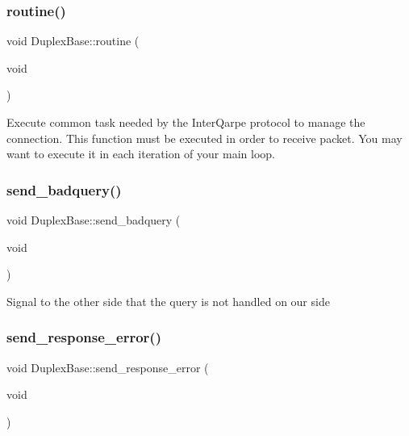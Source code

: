 \subsubsection{\texorpdfstring{routine()}{routine()}}
{\footnotesize\ttfamily void Duplex\+Base\+::routine (\begin{DoxyParamCaption}\item[{void}]{ }\end{DoxyParamCaption})}

Execute common task needed by the Inter\+Qarpe protocol to manage the connection. This function must be executed in order to receive packet. You may want to execute it in each iteration of your main loop. \mbox{\label{classInterQarpe_1_1DuplexBase_a730b5db8ac250221b881a99d7ae5b8a0}} 
\subsubsection{\texorpdfstring{send\+\_\+badquery()}{send\_badquery()}}
{\footnotesize\ttfamily void Duplex\+Base\+::send\+\_\+badquery (\begin{DoxyParamCaption}\item[{void}]{ }\end{DoxyParamCaption})\hspace{0.3cm}{\ttfamily [protected]}}

Signal to the other side that the query is not handled on our side \mbox{\label{classInterQarpe_1_1DuplexBase_a0dbd283fa8303c429eb1011fd01fcc16}} 
\subsubsection{\texorpdfstring{send\+\_\+response\+\_\+error()}{send\_response\_error()}\hspace{0.1cm}{\footnotesize\ttfamily [1/2]}}
{\footnotesize\ttfamily void Duplex\+Base\+::send\+\_\+response\+\_\+error (\begin{DoxyParamCaption}\item[{void}]{ }\end{DoxyParamCaption})\hspace{0.3cm}{\ttfamily [protected]}}

